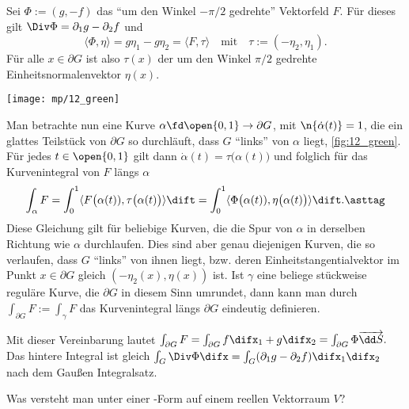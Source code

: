 \begin{antwort}
  Sei $\Phi:=(g,-f)$ das "`um den Winkel $-\pi/2$ gedrehte"' 
  Vektorfeld $F$. Für dieses gilt $\Div \Phi = \partial_1 g - \partial_2 f$ 
  und 
  \[
  \langle \Phi, \eta \rangle = g\eta_1 - g\eta_2 = 
  \langle F, \tau \rangle \quad\text{mit}\quad \tau := (-\eta_2,\eta_1).
  \]
  Für alle $x\in\partial G$ ist also $\tau(x)$ der um den Winkel 
  $\pi/2$ gedrehte Einheitsnormalenvektor $\eta(x)$. 

  \begin{center}
    \texttt{[image: mp/12\_green]}
    \label{fig:12_green}
  \end{center}
  

  Man betrachte nun eine Kurve $\alpha \fd \open{0,1} \to \partial G$, 
  mit $\n{\dot{\alpha}(t)}=1$, die ein glattes Teilstück von 
  $\partial G$ so durchläuft, dass $G$ "`links"' von $\alpha$ liegt, 
  \sieheAbbildung\ref{fig:12_green}. 
  Für jedes $t\in\open{0,1}$ gilt dann 
  $\dot{\alpha}(t)=\tau\big(\alpha(t)\big)$ und folglich für das 
  Kurvenintegral von $F$ längs $\alpha$ 
  \[
  \int_\alpha F = 
  \int_0^1 \langle F\big( \alpha(t) ), 
  \tau\big( \alpha(t) \big) \rangle \dift = 
  \int_0^1 \langle \Phi \big( \alpha(t) ), 
  \eta\big( \alpha(t) \big) \rangle \dift
  . \asttag
  \]
  Diese Gleichung gilt für beliebige Kurven, die die Spur von $\alpha$ 
  in derselben Richtung wie $\alpha$ durchlaufen. Dies sind aber genau 
  diejenigen Kurven, die so verlaufen, dass $G$ "`links"' von ihnen liegt, 
  bzw. deren Einheitstangentialvektor im Punkt $x\in\partial G$ 
  gleich $(-\eta_2(x), \eta(x))$ ist. 
  Ist $\gamma$ eine beliege stückweise reguläre Kurve, die $\partial G$ 
  in diesem Sinn umrundet, dann kann man 
  durch $\int_{\partial G} F:=\int_{\gamma} F$ das Kurvenintegral längs 
  $\partial G$ eindeutig definieren. 

  Mit dieser Vereinbarung lautet {\astref} $
  \int_{\partial G} F = \int_{\partial G} f\difx_1+g\difx_2 = 
  \int_{\partial G} \Phi \overrightarrow{\dd S}.$
  Das hintere Integral ist gleich 
  $\int_G \Div \Phi \difx = \int_G (\partial_1 g - \partial_2 f)\difx_1\difx_2$ 
  nach dem Gauß\sch en Integralsatz.
  \AntEnd
\end{antwort} 

\begin{frage}
  Was versteht man unter einer -Form auf 
  einem reellen Vektorraum $V$?
\end{frage}


